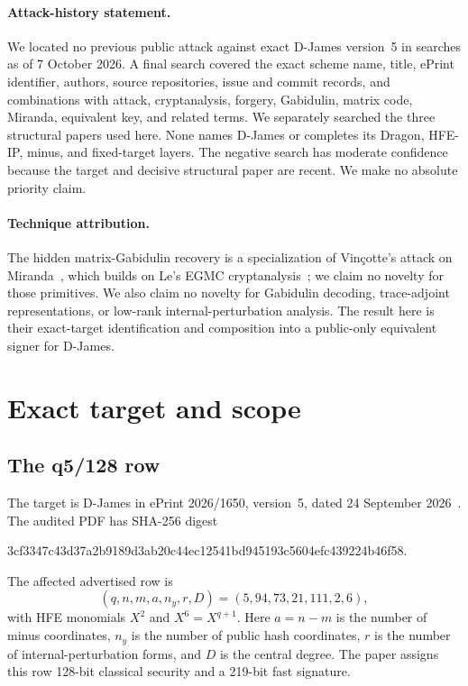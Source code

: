 \documentclass[10pt,a4paper]{article}
\begin{document}
\paragraph{Attack-history statement.}
We located no previous public attack against exact D-James version~5 in
searches as of 7 October 2026.  A final search covered the exact scheme name,
title, ePrint identifier, authors, source repositories, issue and commit
records, and combinations with attack, cryptanalysis, forgery, Gabidulin,
matrix code, Miranda, equivalent key, and related terms.  We separately
searched the three structural papers used here.  None names D-James or
completes its Dragon, HFE-IP, minus, and fixed-target layers.  The negative
search has moderate confidence because the target and decisive structural
paper are recent.  We make no absolute priority claim.

\paragraph{Technique attribution.}
The hidden matrix-Gabidulin recovery is a specialization of Vin\c{c}otte's
attack on Miranda~\cite{vincotte}, which builds on Le's EGMC
cryptanalysis~\cite{le}; we claim no novelty for those primitives.  We also
claim no novelty for Gabidulin decoding, trace-adjoint representations, or
low-rank internal-perturbation analysis.  The result here is their
exact-target identification and composition into a public-only equivalent
signer for D-James.

\section{Exact target and scope}

\subsection{The q5/128 row}

The target is D-James in ePrint 2026/1650, version~5, dated 24 September
2026~\cite{djames}.  The audited PDF has SHA-256 digest
\begin{center}
\small\ttfamily
3cf3347c43d37a2b9189d3ab20c44ec12541bd945193c5604efc439224b46f58.
\end{center}
The affected advertised row is
\[
 (q,n,m,a,n_y,r,D)=(5,94,73,21,111,2,6),
\]
with HFE monomials $X^2$ and $X^6=X^{q+1}$.  Here $a=n-m$ is the number
of minus coordinates, $n_y$ is the number of public hash coordinates, $r$ is
the number of internal-perturbation forms, and $D$ is the central degree.
The paper assigns this row 128-bit classical security and a 219-bit fast
signature.
\end{document}
